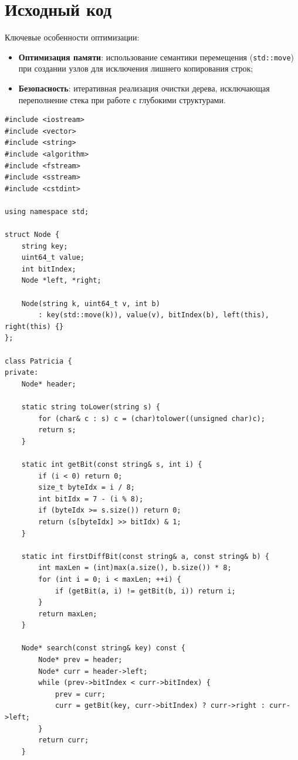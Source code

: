 \section{Исходный код}

Ключевые особенности оптимизации:
\begin{itemize}
    \item \textbf{Оптимизация памяти}: использование семантики перемещения (\texttt{std::move}) при создании узлов для исключения лишнего копирования строк;
    
    \item \textbf{Безопасность}: итеративная реализация очистки дерева, исключающая переполнение стека при работе с глубокими структурами.
\end{itemize}

\begin{lstlisting}[breaklines=true, postbreak=\mbox{\textcolor{red}{$\hookrightarrow$}\space}]
#include <iostream>
#include <vector>
#include <string>
#include <algorithm>
#include <fstream>
#include <sstream>
#include <cstdint>

using namespace std;

struct Node {
    string key;
    uint64_t value;
    int bitIndex;
    Node *left, *right;

    Node(string k, uint64_t v, int b) 
        : key(std::move(k)), value(v), bitIndex(b), left(this), right(this) {}
};

class Patricia {
private:
    Node* header;

    static string toLower(string s) {
        for (char& c : s) c = (char)tolower((unsigned char)c);
        return s;
    }

    static int getBit(const string& s, int i) {
        if (i < 0) return 0;
        size_t byteIdx = i / 8;
        int bitIdx = 7 - (i % 8);
        if (byteIdx >= s.size()) return 0;
        return (s[byteIdx] >> bitIdx) & 1;
    }

    static int firstDiffBit(const string& a, const string& b) {
        int maxLen = (int)max(a.size(), b.size()) * 8;
        for (int i = 0; i < maxLen; ++i) {
            if (getBit(a, i) != getBit(b, i)) return i;
        }
        return maxLen;
    }

    Node* search(const string& key) const {
        Node* prev = header;
        Node* curr = header->left;
        while (prev->bitIndex < curr->bitIndex) {
            prev = curr;
            curr = getBit(key, curr->bitIndex) ? curr->right : curr->left;
        }
        return curr;
    }


\end{lstlisting}
